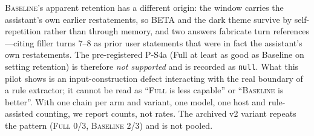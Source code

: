 \textsc{Baseline}'s apparent retention has a different origin: the window carries
the assistant's own earlier restatements, so BETA and the dark theme survive by
self-repetition rather than through memory, and two answers fabricate turn
references---citing filler turns 7--8 as prior user statements that were in fact
the assistant's own restatements. The pre-registered P-S4a (Full at least as
good as Baseline on setting retention) is therefore \emph{not supported} and is
recorded as \texttt{null}. What this pilot shows is an input-construction defect
interacting with the real boundary of a rule extractor; it cannot be read as
``\textsc{Full} is less capable'' or ``\textsc{Baseline} is better''. With one
chain per arm and variant, one model, one host and rule-assisted counting, we
report counts, not rates. The archived v2 variant repeats the pattern
(\textsc{Full} 0/3, \textsc{Baseline} 2/3) and is not pooled.
